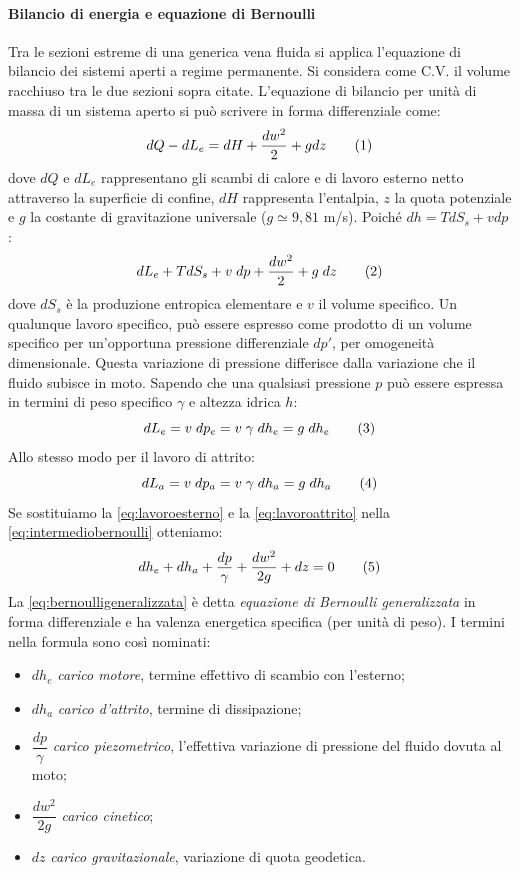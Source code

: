 \paragraph{Bilancio di energia e equazione di Bernoulli}
Tra le sezioni estreme di una generica vena fluida si applica l'equazione di bilancio dei sistemi aperti a regime permanente. Si considera come C.V. il volume racchiuso tra le due sezioni sopra citate. L'equazione di bilancio per unità di massa di un sistema aperto si può scrivere in forma differenziale come:
\[dQ-dL_e=dH+\frac{dw^2}{2}+gdz\addtag\]
dove $dQ$ e $dL_e$ rappresentano gli scambi di calore e di lavoro esterno netto attraverso la superficie di confine, $dH$ rappresenta l'entalpia, $z$ la quota potenziale e \(g\) la costante di gravitazione universale (\(g \simeq 9,81\) m/s). Poiché $dh=TdS_s+vdp$:
\[dL_e+TdS_s+v \; dp+\frac{dw^2}{2}+g \; dz\label{eq:intermediobernoulli}\addtag\]
dove $dS_s$ è la produzione entropica elementare e $v$ il volume specifico. Un qualunque lavoro specifico, può essere espresso come prodotto di un volume specifico per un'opportuna pressione differenziale $dp'$, per omogeneità dimensionale. Questa variazione di pressione differisce dalla variazione che il fluido subisce in moto. Sapendo che una qualsiasi pressione $p$ può essere espressa in termini di peso specifico $\gamma$ e altezza idrica $h$:
\[dL_e=v\;dp_e=v\;\gamma\;dh_e=g\;dh_e\addtag\label{eq:lavoroesterno}\]
Allo stesso modo per il lavoro di attrito:
\[dL_a=v\;dp_a=v\;\gamma\;dh_a=g\;dh_a\addtag\label{eq:lavoroattrito}\]
Se sostituiamo la \eqref{eq:lavoroesterno} e la \eqref{eq:lavoroattrito} nella \eqref{eq:intermediobernoulli} otteniamo:
\[dh_e+dh_a+\frac{dp}{\gamma}+\frac{dw^2}{2g}+dz=0\label{eq:bernoulligeneralizzata}\addtag\]
La \eqref{eq:bernoulligeneralizzata} è detta \textit{equazione di Bernoulli generalizzata} in forma differenziale e ha valenza energetica specifica (per unità di peso). I termini nella formula sono così nominati:
\begin{itemize}
    \item \(dh_e\) \textit{carico motore}, termine effettivo di scambio con l'esterno;
    \item \(dh_a\) \textit{carico d'attrito}, termine di dissipazione;
    \item \(\dfrac{dp}{\gamma}\) \textit{carico piezometrico}, l'effettiva variazione di pressione del fluido dovuta al moto;
    \item \(\dfrac{dw^2}{2g}\) \textit{carico cinetico};
    \item \(dz\) \textit{carico gravitazionale}, variazione di quota geodetica. 
\end{itemize}
